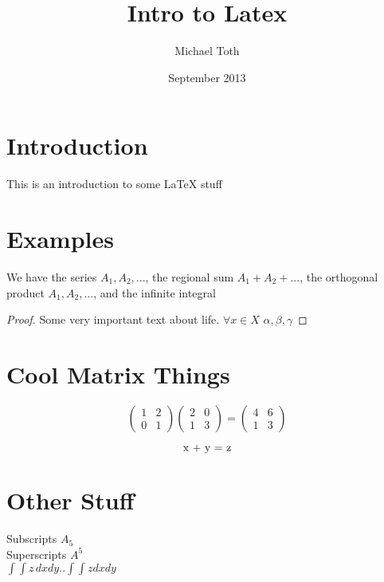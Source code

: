 \documentclass{article} %
\title{Intro to Latex}
\author{Michael Toth}
\date{September 2013}
\begin{document}
\maketitle

\section{Introduction}

This is an introduction to some LaTeX stuff

\section{Examples}

We have the series $A_{1},A_{2},...$,
the regional sum $A_{1} + A_{2} + ... $,
the orthogonal product $A_{1},A_{2},...$,
and the infinite integral

\begin{proof}
Some very important text about life.
$\forall x \in X$
$\alpha, \beta, \gamma$

\end{proof}

\section{Cool Matrix Things}

\begin{equation}
\left(\begin{array}{cc}
1 & 2 \\0 & 1
\end{array}\right)
\left(\begin{array}{cc}
2 & 0\\1 & 3
\end{array}\right)
=
\left(\begin{array}{cc}
4 & 6 \\1 & 3
\end{array}\right)
\end{equation}

\begin{equation}
$x + y = z$
\end{equation}

\section{Other Stuff}

Subscripts $A_{5}$ \\
Superscripts $A^{5}$ \\
\(\int\!\!\int z\, dx dy .. \int\int z dx dy\)
\end{document}
